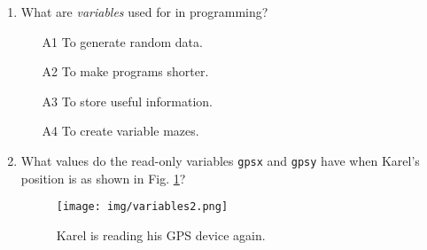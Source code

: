 \begin{enumerate}
\item What are {\em variables} used for in programming? 
\begin{enumerate}
\item[A1] To generate random data.
\item[A2] To make programs shorter.
\item[A3] To store useful information.
\item[A4] To create variable mazes.
\end{enumerate}
\item What values do the read-only variables {\tt gpsx} and {\tt gpsy} have when Karel's
position is as shown in Fig. \ref{fig:var2}?

\begin{figure}[!ht]
\begin{center}
\texttt{[image: img/variables2.png]}
\end{center}
\vspace{-4mm}
\caption{Karel is reading his GPS device again.}
\label{fig:var2}
\end{figure}
\noindent


\end{enumerate}
